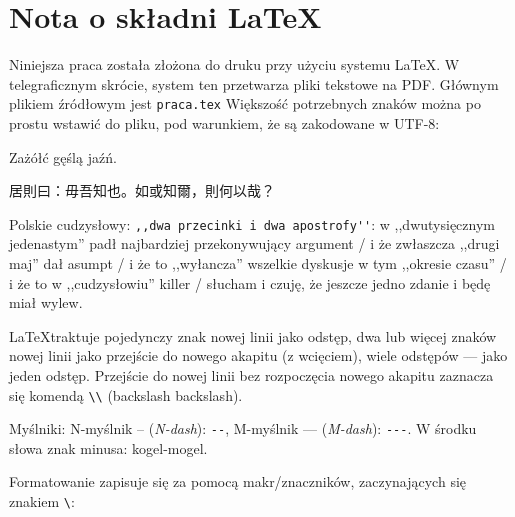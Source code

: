 \section{Nota o składni \LaTeX}
Niniejsza praca została złożona do druku przy użyciu systemu \LaTeX. W telegraficznym skrócie, system ten przetwarza pliki tekstowe na PDF. Głównym plikiem źródłowym jest \verb_praca.tex_ Większość potrzebnych znaków można po prostu wstawić do pliku, pod warunkiem, że są zakodowane w UTF-8:

Zażółć gęślą jaźń.

居則曰：毋吾知也。如或知爾，則何以哉？

Polskie cudzysłowy: \verb_,,dwa przecinki i dwa apostrofy''_: w ,,dwutysięcznym jedenastym'' padł najbardziej przekonywujący argument / i że zwłaszcza ,,drugi maj'' dał asumpt / i że to ,,wyłancza'' wszelkie dyskusje w tym ,,okresie czasu'' / i że to w ,,cudzysłowiu'' killer / słucham i czuję, że jeszcze jedno zdanie i będę miał wylew.

\LaTeX traktuje pojedynczy znak nowej linii jako odstęp, dwa lub więcej znaków nowej linii jako przejście do nowego akapitu (z wcięciem), wiele odstępów --- jako jeden odstęp. Przejście do nowej linii bez rozpoczęcia nowego akapitu zaznacza się komendą \verb_\\_ (backslash backslash).

Myślniki: N-myślnik -- (\textit{N-dash}): \verb_--_, M-myślnik --- (\textit{M-dash}): \verb_---_. W środku słowa znak minusa: kogel-mogel.

Formatowanie zapisuje się za pomocą makr/znaczników, zaczynających się znakiem \verb_\_:

